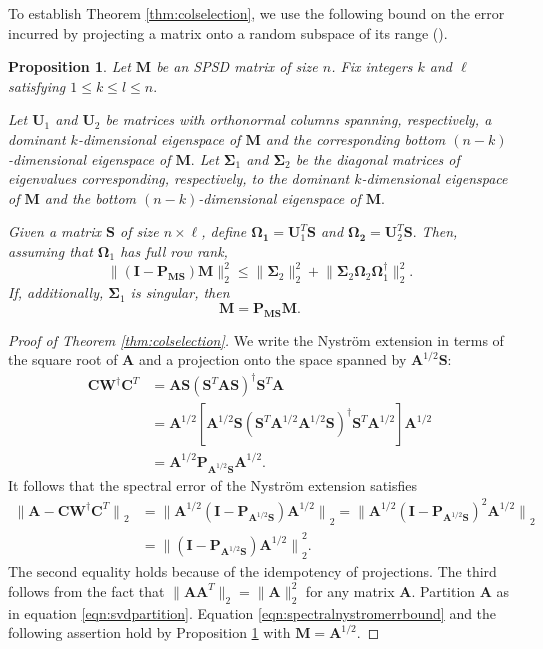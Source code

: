 \documentclass[11pt,letterpaper,twoside,reqno,nosumlimits]{amsart}
\def\pinv{\dagger}
\def\transp{T}
\newcommand{\mat}[1]{\ensuremath{\mathbf{#1}}}
\newcommand{\norm}[1]{\ensuremath{\big\|#1\big\|}}
\newtheorem{prop}{Proposition}
\theoremstyle{remark}
\begin{document}
To establish Theorem \ref{thm:colselection}, we use the following bound on the error incurred by projecting a matrix onto a random subspace of its range (\cite[Theorem 9.1]{HMT11}).

\begin{prop}
 Let $\mat{M}$ be an SPSD matrix of size $n$. Fix integers $k$ and $\ell$ satisfying $1 \leq k \leq l \leq n.$ 

Let $\mat{U}_1$ and $\mat{U}_2$ be matrices with orthonormal columns spanning, respectively, a dominant $k$-dimensional eigenspace of $\mat{M}$ and the corresponding bottom $(n-k)$-dimensional eigenspace of $\mat{M}.$ Let $\mat{\Sigma}_1$ and $\mat{\Sigma}_2$ be the diagonal matrices of eigenvalues corresponding, respectively, to the dominant $k$-dimensional eigenspace of $\mat{M}$ and the bottom $(n-k)$-dimensional eigenspace of $\mat{M}.$ 

Given a matrix $\mat{S}$ of size $n \times \ell$, define $\mat{\Omega_1} = \mat{U}_1^\transp \mat{S}$ and $\mat{\Omega_2} = \mat{U}_2^\transp \mat{S}.$ Then, assuming that $\mat{\Omega}_1$ has full row rank,
\[
\| (\mat{I} - \mat{P}_{\mat{M}\mat{S}}) \mat{M} \|_2^2 \leq \| \mat{\Sigma}_2 \|_2^2 + \big\| \mat{\Sigma}_2 \mat{\Omega}_2 \mat{\Omega}_1^\pinv \big \|_2^2.
\]
If, additionally, $\mat{\Sigma}_1$ is singular, then
\[
 \mat{M} = \mat{P}_{\mat{M}\mat{S}}\mat{M}.
\]

 \label{prop:deterministicerrorbound}
\end{prop}

\begin{proof}[Proof of Theorem \ref{thm:colselection}]
We write the Nystr\"om extension in terms of the square root of $\mat{A}$ and a projection onto the space spanned by $\mat{A}^{1/2} \mat{S}:$
\begin{align*}
  \mat{C} \mat{W}^\pinv \mat{C}^\transp & = \mat{A} \mat{S} (\mat{S}^\transp \mat{A} \mat{S})^\pinv \mat{S}^\transp \mat{A} \\
  & = \mat{A}^{1/2} [\mat{A}^{1/2} \mat{S} (\mat{S}^\transp \mat{A}^{1/2} \mat{A}^{1/2} \mat{S})^\pinv \mat{S}^\transp \mat{A}^{1/2}] \mat{A}^{1/2} \\
  & = \mat{A}^{1/2} \mat{P}_{\mat{A}^{1/2} \mat{S}} \mat{A}^{1/2}.
\end{align*}
It follows that the spectral error of the Nystr\"om extension satisfies
\begin{align*}
  \norm{\mat{A} - \mat{C} \mat{W}^\pinv \mat{C}^\transp}_2 & = \norm{\mat{A}^{1/2} ( \mat{I} - \mat{P}_{\mat{A}^{1/2}\mat{S}}) \mat{A}^{1/2}}_2  = \norm{\mat{A}^{1/2} ( \mat{I} - \mat{P}_{\mat{A}^{1/2}\mat{S}})^2 \mat{A}^{1/2}}_2\\ 
 & = \norm{( \mat{I} - \mat{P}_{\mat{A}^{1/2}\mat{S}}) \mat{A}^{1/2}}_2^2.
\end{align*}
The second equality holds because of the idempotency of projections. The third follows from the fact that $\|\mat{A}\mat{A}^\transp\|_2 = \|\mat{A}\|_2^2$ for any matrix $\mat{A}.$ Partition $\mat{A}$ as in equation \eqref{eqn:svdpartition}. Equation \eqref{eqn:spectralnystromerrbound} and the following assertion hold by Proposition \ref{prop:deterministicerrorbound} with $\mat{M} = \mat{A}^{1/2}.$
\end{proof}
\end{document}
